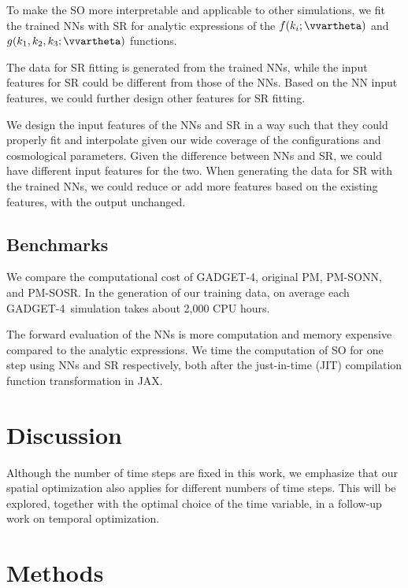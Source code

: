 \documentclass[modern, trackchanges, dvipsnames]{aastex631}
\newcommand{\GADGET}{{{\fontsize{10pt}{12pt}\selectfont GADGET}-4}}
\begin{document}
To make the SO more interpretable and applicable to other simulations,
we fit the trained NNs with SR for analytic expressions of the $f(k_i;
\vvartheta)$ and $g(k_1, k_2, k_3; \vvartheta)$ functions.

The data for SR fitting is generated from the trained NNs, while the
input features for SR could be different from those of the NNs.
Based on the NN input features, we could further design other features
for SR fitting.

We design the input features of the NNs and SR in a way such that they
could properly fit and interpolate given our wide coverage of the
configurations and cosmological parameters.
Given the difference between NNs and SR, we could have different input
features for the two.
When generating the data for SR with the trained NNs, we could reduce or
add more features based on the existing features, with the output
unchanged.


\subsection{Benchmarks}
We compare the computational cost of \GADGET, original PM, PM-SONN, and
PM-SOSR.
In the generation of our training data, on average each \GADGET\
simulation takes about 2,000 CPU hours.


The forward evaluation of the NNs is more computation and memory
expensive compared to the analytic expressions.
We time the computation of SO for one step using NNs and SR
respectively, both after the just-in-time (JIT) compilation function
transformation in JAX.


\vspace{1em}
\section{Discussion}

Although the number of time steps are fixed in this work, we emphasize that our
spatial optimization also applies for different numbers of time steps.
This will be explored, together with the optimal choice of the time variable, in
a follow-up work on temporal optimization.


\vspace{1em}
\section{Methods}


\vspace{1em}
\end{document}

